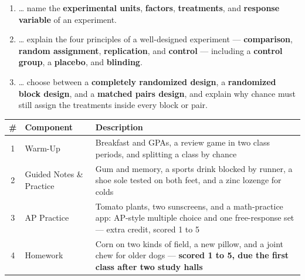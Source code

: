 \documentclass[12pt]{article}
\begin{document}

\namedateperiod
\vspace{0.18in}

\boxguard[14]
\begin{learningtargetbox}
\small
\begin{enumerate}[leftmargin=1.5em, itemsep=5pt]
  \item \ldots{} name the \textbf{experimental units}, \textbf{factors}, \textbf{treatments},
        and \textbf{response variable} of an experiment.
  \item \ldots{} explain the four principles of a well-designed experiment ---
        \textbf{comparison}, \textbf{random assignment}, \textbf{replication}, and
        \textbf{control} --- including a \textbf{control group}, a \textbf{placebo}, and
        \textbf{blinding}.
  \item \ldots{} choose between a \textbf{completely randomized design}, a
        \textbf{randomized block design}, and a \textbf{matched pairs design}, and explain
        why chance must still assign the treatments inside every block or pair.
\end{enumerate}
\end{learningtargetbox}

\vspace{0.14in}

\boxguard[14]
\begin{tocbox}
\small
\renewcommand{\arraystretch}{1.5}
\begin{tabularx}{\linewidth}{@{} c l X @{}}
\rowcolor{sky}
\textbf{\#} & \textbf{Component} & \textbf{Description} \\
\midrule
1 & Warm-Up & Breakfast and GPAs, a review game in two class periods, and splitting a class by
                 chance \\
2 & Guided Notes \& Practice & Gum and memory, a sports drink blocked by runner, a shoe sole
                 tested on both feet, and a zinc lozenge for colds \\
3 & AP Practice & Tomato plants, two sunscreens, and a math-practice app: AP-style multiple
                 choice and one free-response set --- extra credit, scored 1 to 5 \\
4 & Homework & Corn on two kinds of field, a new pillow, and a joint chew for older dogs ---
                 \textbf{scored 1 to 5, due the first class after two study halls} \\
\end{tabularx}
\end{tocbox}
\end{document}

